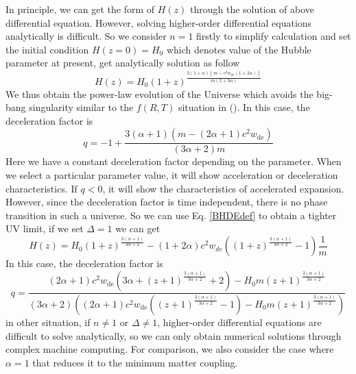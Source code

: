 \documentclass[a4paper,fleqn]{cas-sc}
\begin{document}
In principle, we can get the form of $H(z)$ through the solution of above differential equation. However, solving higher-order differential equations analytically is difficult. So we consider $n=1$ firstly to simplify calculation and set the initial condition $H(z=0)=H_0$ which denotes value of the Hubble parameter at present, get analytically solution as follow
\begin{equation}
    H(z)= H_0 (1+z)^{\frac{3 (1+\alpha) \left(m-c^2 w_\text{de}(1+2\alpha)\right)}{m(2+3\alpha)}}
\end{equation}
We thus obtain the power-law evolution of the Universe which avoids the big-bang singularity similar to the $f(R,T)$ situation in (\cite{singhStatefinderDiagnosisHolographic2016}). In this case, the deceleration factor is
\begin{equation}
    q = -1+\frac{3 (\alpha +1) \left(m-(2 \alpha +1) c^2 w_\text{de}\right)}{(3 \alpha +2) m}
\end{equation}
Here we have a constant deceleration factor depending on the parameter. When we select a particular parameter value, it will show acceleration or deceleration characteristics. If $q<0$, it will show the characteristics of accelerated expansion. However, since the deceleration factor is time independent, there is no phase transition in such a universe. So we can use Eq. \eqref{BHDEdef} to obtain a tighter UV limit, if we set $\Delta=1$ we can get 
\begin{equation}
    H(z)= H_0 (1+z)^{\frac{3 (\alpha +1)}{3\alpha +2}}-(1+2 \alpha) c^2 w_{de} \left((1+z)^{\frac{3 (\alpha +1)}{3\alpha +2}}-1\right)\frac{1}{m}
\end{equation}
In this case, the deceleration factor is
\begin{equation}
    q=\frac{(2 \alpha +1) c^2 w_\text{de} \left(3 \alpha +(z+1)^{\frac{3 (\alpha +1)}{3 \alpha +2}}+2\right)-H_0 m (z+1)^{\frac{3 (\alpha +1)}{3 \alpha +2}}}{(3 \alpha +2) \left((2 \alpha +1) c^2 w_\text{de} \left((z+1)^{\frac{3 (\alpha +1)}{3 \alpha +2}}-1\right)-H_0 m (z+1)^{\frac{3 (\alpha +1)}{3 \alpha +2}}\right)}
\end{equation}
in other situation, if $n \neq 1$ or $\Delta \neq 1$, higher-order differential equations are difficult to solve analytically, so we can only obtain numerical solutions through complex machine computing. For comparison, we also consider the case where $\alpha=1$ that reduces it to the minimum matter coupling.
\end{document}
